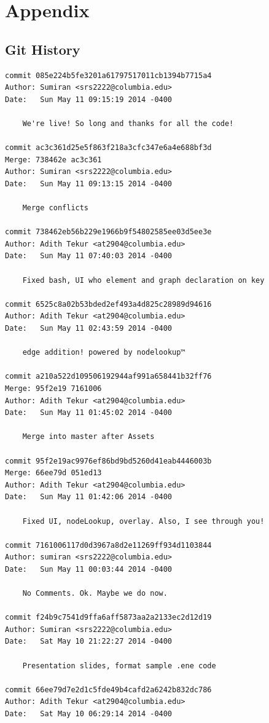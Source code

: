 \documentclass[a4paper]{article}
\begin{document}
\newpage
\section{Appendix}
\subsection{Git History}
\begin{verbatim}
commit 085e224b5fe3201a61797517011cb1394b7715a4
Author: Sumiran <srs2222@columbia.edu>
Date:   Sun May 11 09:15:19 2014 -0400

    We're live! So long and thanks for all the code!

commit ac3c361d25e5f863f218a3cfc347e6a4e688bf3d
Merge: 738462e ac3c361
Author: Sumiran <srs2222@columbia.edu>
Date:   Sun May 11 09:13:15 2014 -0400

    Merge conflicts

commit 738462eb56b229e1966b9f54802585ee03d5ee3e
Author: Adith Tekur <at2904@columbia.edu>
Date:   Sun May 11 07:40:03 2014 -0400

    Fixed bash, UI who element and graph declaration on key

commit 6525c8a02b53bded2ef493a4d825c28989d94616
Author: Adith Tekur <at2904@columbia.edu>
Date:   Sun May 11 02:43:59 2014 -0400

    edge addition! powered by nodelookup™

commit a210a522d109506192944af991a658441b32ff76
Merge: 95f2e19 7161006
Author: Adith Tekur <at2904@columbia.edu>
Date:   Sun May 11 01:45:02 2014 -0400

    Merge into master after Assets

commit 95f2e19ac9976ef86bd9bd5260d41eab4446003b
Merge: 66ee79d 051ed13
Author: Adith Tekur <at2904@columbia.edu>
Date:   Sun May 11 01:42:06 2014 -0400

    Fixed UI, nodeLookup, overlay. Also, I see through you!

commit 7161006117d0d3967a8d2e11269ff934d1103844
Author: sumiran <srs2222@columbia.edu>
Date:   Sun May 11 00:03:44 2014 -0400

    No Comments. Ok. Maybe we do now.

commit f24b9c7541d9ffa6aff5873aa2a2133ec2d12d19
Author: Sumiran <srs2222@columbia.edu>
Date:   Sat May 10 21:22:27 2014 -0400

    Presentation slides, format sample .ene code

commit 66ee79d7e2d1c5fde49b4cafd2a6242b832dc786
Author: Adith Tekur <at2904@columbia.edu>
Date:   Sat May 10 06:29:14 2014 -0400


\end{verbatim}
\end{document}

